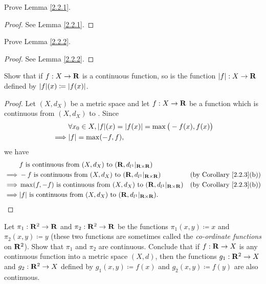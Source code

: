 \exercisesection

\begin{exercise}\label{ex 2.2.1}
    Prove Lemma \ref{2.2.1}.
\end{exercise}

\begin{proof}
    See Lemma \ref{2.2.1}.
\end{proof}

\begin{exercise}\label{ex 2.2.2}
    Prove Lemma \ref{2.2.2}.
\end{exercise}

\begin{proof}
    See Lemma \ref{2.2.2}.
\end{proof}

\begin{exercise}\label{ex 2.2.3}
    Show that if \(f : X \to \mathbf{R}\) is a continuous function, so is the function \(\left\lvert f\right\rvert : X \to \mathbf{R}\) defined by \(\abs{f}(x) \coloneqq \abs{f(x)}\).
\end{exercise}

\begin{proof}
    Let \((X, d_X)\) be a metric space and let \(f : X \to \mathbf{R}\) be a function which is continuous from \((X, d_X)\) to \(\).
    Since
    \begin{align*}
                 & \forall x_0 \in X, \abs{f}(x) = \abs{f(x)} = \max\big(-f(x), f(x)\big) \\
        \implies & \abs{f} = \max(-f, f),
    \end{align*}
    we have
    \begin{align*}
                 & f \text{ is continuous from } (X, d_X) \text{ to } (\R, d_{l^1}|_{\R \times \R})                                                  \\
        \implies & -f \text{ is continuous from } (X, d_X) \text{ to } (\R, d_{l^1}|_{\R \times \R})          & \text{(by Corollary \ref{2.2.3}(b))} \\
        \implies & \max(f, -f) \text{ is continuous from } (X, d_X) \text{ to } (\R, d_{l^1}|_{\R \times \R}) & \text{(by Corollary \ref{2.2.3}(b))} \\
        \implies & \abs{f} \text{ is continuous from } (X, d_X) \text{ to } (\R, d_{l^1}|_{\R \times \R}).
    \end{align*}
\end{proof}

\begin{exercise}\label{ex 2.2.4}
    Let \(\pi_1 : \mathbf{R}^2 \to \mathbf{R}\) and \(\pi_2 : \mathbf{R}^2 \to \mathbf{R}\) be the functions \(\pi_1(x, y) \coloneqq x\) and \(\pi_2(x, y) \coloneqq y\) (these two functions are sometimes called the \emph{co-ordinate functions} on \(\mathbf{R}^2\)).
    Show that \(\pi_1\) and \(\pi_2\) are continuous.
    Conclude that if \(f : \mathbf{R} \to X\) is any continuous function into a metric space \((X, d)\), then the functions \(g_1 : \mathbf{R}^2 \to X\) and \(g_2 : \mathbf{R}^2 \to X\) defined by \(g_1(x, y) \coloneqq f(x)\) and \(g_2(x, y) \coloneqq f(y)\) are also continuous.
\end{exercise}

